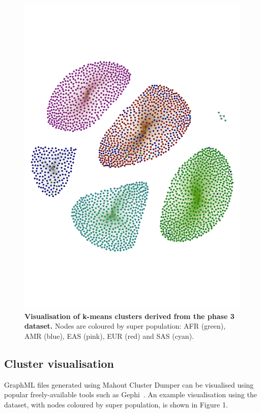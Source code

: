 \documentclass{bioinfo}
\begin{document}
\begin{figure}[!tpb]%
\centerline{\includegraphics[type=pdf,ext=.pdf,read=.pdf, scale=0.40]{gephi-p3}}
        \label{fig:sign}
        \caption{{\bf Visualisation of k-means clusters derived from the phase 3 dataset.}
        Nodes are coloured by super population: AFR (green), AMR (blue), EAS (pink), EUR (red) and SAS (cyan). 
}
\end{figure}


\subsection*{Cluster visualisation}
GraphML files generated using Mahout Cluster Dumper can be visualised using popular freely-available tools such as Gephi~\citep{ICWSM09154}. An example visualisation using the \FullPhasethree{} dataset, with nodes coloured by super population, is shown in Figure 1.
\end{document}
